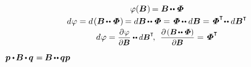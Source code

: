 \nopagebreak\begin{equation*}\begin{array}{c}
\varphi(\bm{B}\hspace{.1ex}) \hspace{-0.2ex}
= \bm{B} \hspace{-0.2ex} \dotdotp \hspace{-0.25ex} \scalebox{1.1}[1]{$\bm{\mathit{\Phi}}$}
\\[.2em]
%
d \hspace{.1ex} \varphi
= d \hspace{.2ex} ( \bm{B} \hspace{-0.2ex} \dotdotp \hspace{-0.25ex} \scalebox{1.1}[1]{$\bm{\mathit{\Phi}}$} \hspace{.1ex} ) \hspace{-0.2ex}
= d \bm{B} \hspace{-0.2ex} \dotdotp \hspace{-0.25ex} \scalebox{1.1}[1]{$\bm{\mathit{\Phi}}$}
= \hspace{-0.1ex} \scalebox{1.1}[1]{$\bm{\mathit{\Phi}}$} \hspace{-0.12ex} \dotdotp d \bm{B}
= \hspace{-0.1ex} \scalebox{1.1}[1]{$\bm{\mathit{\Phi}}$}^{\T} \hspace{-0.4ex} \dotdotp d \bm{B}^{\T}
\\[.2em]
%
d \hspace{.1ex} \varphi
= \scalebox{0.92}{$\displaystyle \frac{\partial \hspace{.1ex} \varphi}{\partial \hspace{-0.1ex} \bm{B}} \dotdotp d \bm{B}^{\T}$} \hspace{-0.3ex} ,
\:\:
\scalebox{0.92}{$\displaystyle \frac{\partial \hspace{-0.1ex} \left( \bm{B} \hspace{-0.2ex} \dotdotp \hspace{-0.25ex} \scalebox{1.1}[1]{$\bm{\mathit{\Phi}}$} \right)}{\partial \hspace{-0.1ex} \bm{B}}$}
= \hspace{-0.1ex} \scalebox{1.1}[1]{$\bm{\mathit{\Phi}}$}^{\T}
\end{array}\end{equation*}

${\bm{p} \dotp \hspace{-0.2ex} \bm{B} \hspace{-0.16ex} \dotp \hspace{-0.1ex} \bm{q} \hspace{.1ex} =
\hspace{-0.1ex} \bm{B} \hspace{-0.16ex} \dotdotp \hspace{-0.1ex} \bm{q} \bm{p}}$


